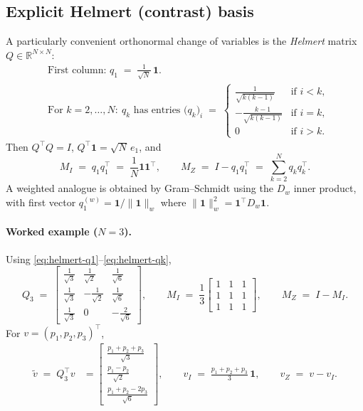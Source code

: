 \documentclass[11pt]{article}
\newcommand{\one}{\mathbf{1}}
\newcommand{\R}{\mathbb{R}}
\begin{document}
\subsection{Explicit Helmert (contrast) basis}
A particularly convenient orthonormal change of variables is the \emph{Helmert} matrix $Q\in\R^{N\times N}$:
\begin{align}
&\text{First column: } q_1 \;=\; \frac{1}{\sqrt N}\,\one. \label{eq:helmert-q1}\\[3pt]
&\text{For } k=2,\dots,N:\
q_k \text{ has entries } \big(q_k\big)_i \;=\;
\begin{cases}
\frac{1}{\sqrt{k(k-1)}} & \text{if } i<k,\\[3pt]
-\frac{k-1}{\sqrt{k(k-1)}} & \text{if } i=k,\\[3pt]
0 & \text{if } i>k.
\end{cases}
\label{eq:helmert-qk}
\end{align}
Then $Q^\top Q=I$, $Q^\top \one = \sqrt{N}\,e_1$, and
\begin{equation}
M_I \;=\; q_1 q_1^\top \;=\; \frac{1}{N}\one\one^\top,\qquad
M_Z \;=\; I - q_1 q_1^\top \;=\; \sum_{k=2}^N q_k q_k^\top.
\end{equation}
A weighted analogue is obtained by Gram–Schmidt using the $D_w$ inner product, with first vector $q^{(w)}_1=\one/\|\one\|_w$ where $\|\one\|_w^2=\one^\top D_w \one$.

\paragraph{Worked example ($N=3$).}
Using \eqref{eq:helmert-q1}–\eqref{eq:helmert-qk},
\begin{equation}
Q_3 \;=\;
\begin{bmatrix}
\frac{1}{\sqrt{3}} & \frac{1}{\sqrt{2}} & \frac{1}{\sqrt{6}} \\[5pt]
\frac{1}{\sqrt{3}} & -\frac{1}{\sqrt{2}} & \frac{1}{\sqrt{6}} \\[5pt]
\frac{1}{\sqrt{3}} & 0 & -\frac{2}{\sqrt{6}}
\end{bmatrix},\qquad
M_I \;=\; \frac{1}{3}
\begin{bmatrix}
1 & 1 & 1 \\ 1 & 1 & 1 \\ 1 & 1 & 1
\end{bmatrix},\qquad
M_Z \;=\; I - M_I.
\end{equation}
For $v=(p_1,p_2,p_3)^\top$,
\begin{align}
\tilde v \;=\; Q_3^\top v
&= \begin{bmatrix}
\frac{p_1+p_2+p_3}{\sqrt{3}}\\[3pt]
\frac{p_1-p_2}{\sqrt{2}}\\[3pt]
\frac{p_1+p_2-2p_3}{\sqrt{6}}
\end{bmatrix},\qquad
v_I \;=\; \frac{p_1+p_2+p_3}{3}\,\one,\qquad
v_Z \;=\; v - v_I.
\end{align}
\end{document}
